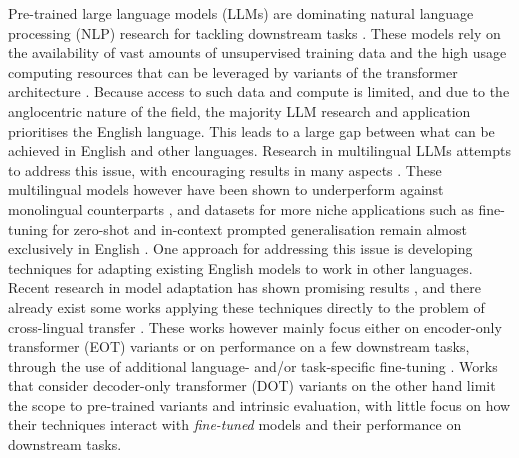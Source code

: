 \documentclass[11pt]{article}
\begin{document}
Pre-trained large language models (LLMs) are dominating natural language processing (NLP) research
for tackling downstream tasks \citep{devlin_bert_2019,raffel_exploring_2020,brown_language_2020}.
These models rely on the availability of vast amounts of unsupervised training data and the high
usage computing resources that can be leveraged by variants of the transformer architecture
\citep{vaswani_attention_2017}. Because access to such data and compute is limited, and due to the
anglocentric nature of the field, the majority LLM research and application prioritises the English
language. This leads to a large gap between what can be achieved in English and other languages.
Research in multilingual LLMs attempts to address this issue, with encouraging results in many
aspects \citep{conneau_unsupervised_2020,bigscience_workshop_bloom_2022}. These multilingual models
however have been shown to underperform against monolingual counterparts \citep{wu_are_2020}, and
datasets for more niche applications such as fine-tuning for zero-shot and in-context prompted
generalisation remain almost exclusively in English
\citep{bach_promptsource_2022,mishra_cross-task_2022}. One approach for addressing this issue is
developing techniques for adapting existing English models to work in other languages. Recent
research in model adaptation has shown promising results
\citep{houlsby_parameter-efficient_2019,ainsworth_git_2022}, and there already exist some works
applying these techniques directly to the problem of cross-lingual transfer
\citep{artetxe_cross-lingual_2020}. These works however mainly focus either on encoder-only
transformer (EOT) variants or on performance on a few downstream tasks, through the use of
additional language- and/or task-specific fine-tuning
\citep{de_vries_adapting_2021,gogoulou_cross-lingual_2022}. Works that consider decoder-only
transformer (DOT) variants on the other hand \citep{de_vries_as_2021, minixhofer_wechsel_2022} limit
the scope to pre-trained variants and intrinsic evaluation, with little focus on how their techniques
interact with \textit{fine-tuned} models and their performance on downstream tasks.
\end{document}
